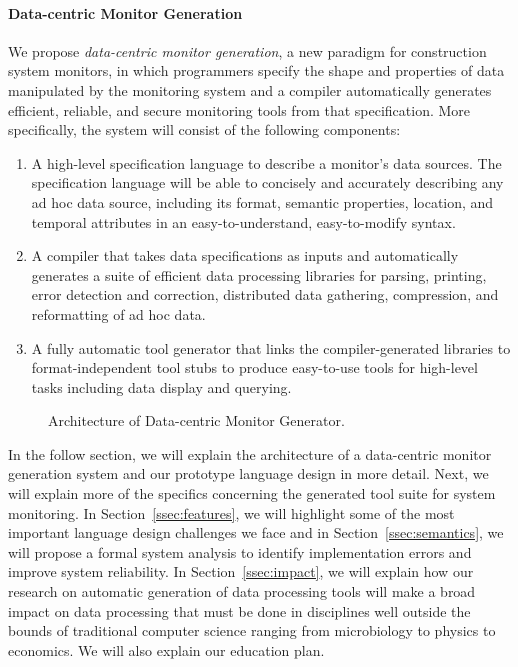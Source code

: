 \paragraph*{Data-centric Monitor Generation}
We propose {\em data-centric monitor generation}, a new paradigm
for construction system monitors, in which programmers
specify the shape and properties of data manipulated by
the monitoring system and a compiler automatically
generates efficient, reliable, and secure
monitoring tools from that specification.
More specifically, the system will consist of the 
following components:

\begin{enumerate}

\item A high-level specification language to describe a monitor's
data sources.  The specification language will be able to
concisely and accurately describing any ad hoc data source,
including its format, semantic properties, location, and
temporal attributes in an easy-to-understand, easy-to-modify syntax.

\item A compiler that takes data specifications as inputs and
automatically generates a suite of 
efficient data processing libraries for parsing, printing, error detection
and correction, distributed data gathering, compression, and 
reformatting of ad hoc data.

\item A fully automatic tool generator that links the compiler-generated 
libraries to format-independent tool stubs to produce easy-to-use 
tools for high-level tasks including data display and querying.

\end{enumerate}

\begin{figure}[t]
\begin{center}
\centerline{}
\end{center}
\caption{\label{fig:arch} Architecture of Data-centric Monitor Generator.
}
\end{figure}

In the follow section, we will explain 
the architecture of a data-centric monitor generation system
and our prototype language design in more detail.  
Next, we will explain more of the specifics concerning
the generated tool suite for system monitoring.
In Section~\ref{ssec:features}, we will highlight some of the most
important language design challenges we face and
in Section~\ref{ssec:semantics}, we will propose a
formal system analysis to identify implementation errors
and improve system reliability.
In Section~\ref{ssec:impact}, we will explain how our research
on automatic generation of data processing tools
will make a broad impact on data processing that must be done
in disciplines well outside the bounds of
traditional computer science ranging from microbiology to physics to
economics.  We will also explain our education plan.
